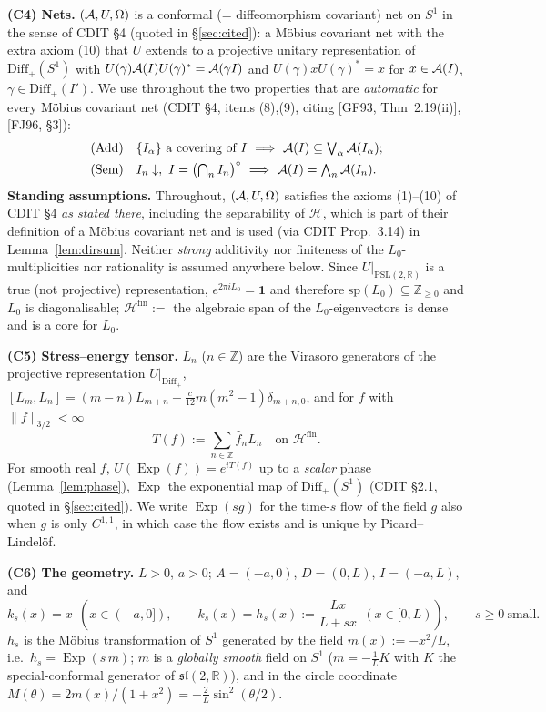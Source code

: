 \documentclass[11pt]{article}
\newcommand{\Om}{\Omega}
\newcommand{\Hil}{\mathcal H}
\newcommand{\Diff}{\mathrm{Diff}_+}
\newcommand{\norm}[1]{\lVert #1\rVert}
\newcommand{\Hfin}{\Hil^{\mathrm{fin}}}
\newcommand{\one}{\mathbf 1}
\newcommand{\Exp}{\operatorname{Exp}}
\begin{document}
\textbf{(C4) Nets.}  $(\cA,U,\Om)$ is a conformal (= diffeomorphism covariant) net on $S^1$ in the sense of
CDIT \S4 (quoted in \S\ref{sec:cited}): a M\"obius covariant net with the extra axiom (10) that $U$ extends to a
projective unitary representation of $\Diff(S^1)$ with $U(\gamma)\mathcal A(I)U(\gamma)^*=\mathcal A(\gamma I)$ and
$U(\gamma)x U(\gamma)^*=x$ for $x\in\mathcal A(I)$, $\gamma\in\Diff(I')$.  We use throughout the two properties that
are \emph{automatic} for every M\"obius covariant net (CDIT \S4, items (8),(9), citing [GF93, Thm~2.19(ii)], [FJ96, \S3]):
\begin{align}
 &\text{(Add)\quad}\{I_\alpha\}\ \text{a covering of }I\ \Longrightarrow\ \cA(I)\subseteq\textstyle\bigvee_\alpha\cA(I_\alpha);
 \label{eq:add}\\
 &\text{(Sem)\quad}I_n\downarrow,\ I=\bigl(\textstyle\bigcap_nI_n\bigr)^\circ\ \Longrightarrow\ \cA(I)=\textstyle\bigwedge_n\cA(I_n).
 \label{eq:sem}
\end{align}
\textbf{Standing assumptions.}  Throughout, $(\cA,U,\Om)$ satisfies the axioms (1)--(10) of CDIT \S4 \emph{as
stated there}, including the separability of $\Hil$, which is part of their definition of a M\"obius covariant net
and is used (via CDIT Prop.~3.14) in Lemma~\ref{lem:dirsum}.  Neither \emph{strong} additivity nor finiteness of the
$L_0$-multiplicities nor rationality is assumed anywhere below.
Since $U|_{\mathrm{PSL}(2,\mathbb R)}$ is a true (not projective) representation, $e^{2\pi iL_0}=\one$ and therefore
$\mathrm{sp}(L_0)\subseteq\mathbb Z_{\ge0}$ and $L_0$ is diagonalisable; $\Hfin:=$ the algebraic span of the
$L_0$-eigenvectors is dense and is a core for $L_0$.

\textbf{(C5) Stress--energy tensor.}  $L_n$ ($n\in\mathbb Z$) are the Virasoro generators of the projective representation
$U|_{\Diff}$, $[L_m,L_n]=(m-n)L_{m+n}+\frac c{12}m(m^2-1)\delta_{m+n,0}$, and for $f$ with $\norm f_{3/2}<\infty$
\begin{equation}\label{eq:Tdef}
 T(f):=\sum_{n\in\mathbb Z}\hat f_n L_n\quad\text{on }\Hfin .
\end{equation}
For smooth real $f$, $U(\Exp(f))=e^{iT(f)}$ up to a \emph{scalar} phase (Lemma~\ref{lem:phase}), $\Exp$ the
exponential map of $\Diff(S^1)$
(CDIT \S2.1, quoted in \S\ref{sec:cited}).  We write $\Exp(sg)$ for the time-$s$ flow of the field $g$ also when $g$
is only $C^{1,1}$, in which case the flow exists and is unique by Picard--Lindel\"of.

\textbf{(C6) The geometry.}  $L>0$, $a>0$; $A=(-a,0)$, $D=(0,L)$, $I=(-a,L)$, and
\begin{equation}\label{eq:ks}
 k_s(x)=x\ \ (x\in(-a,0]),\qquad k_s(x)=h_s(x):=\frac{Lx}{L+sx}\ \ (x\in[0,L)),\qquad s\ge0\ \text{small}.
\end{equation}
$h_s$ is the M\"obius transformation of $S^1$ generated by the field $m(x):=-x^2/L$, i.e.\ $h_s=\Exp(s\,m)$;
$m$ is a \emph{globally smooth} field on $S^1$ ($m=-\frac1L K$ with $K$ the special-conformal generator of
$\mathfrak{sl}(2,\mathbb R)$), and in the circle coordinate
$M(\theta)=2m(x)/(1+x^2)=-\frac2L\sin^2(\theta/2)$.
\end{document}
